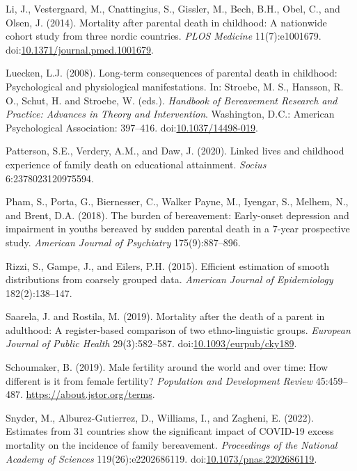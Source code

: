 \documentclass[
  11pt,
  letterpaper,
]{article}
\newlength{\cslhangindent}
\newlength{\cslentryspacingunit} %
\newenvironment{CSLReferences}[2] %
 {%
  \setlength{\parindent}{0pt}
  \ifodd #1
  \let\oldpar\par
  \def\par{\hangindent=\cslhangindent\oldpar}
  \fi
  \setlength{\parskip}{#2\cslentryspacingunit}
 }%
 {}
\begin{document}
\begin{CSLReferences}{1}{0}
\leavevmode{}%
Li, J., Vestergaard, M., Cnattingius, S., Gissler, M., Bech, B.H., Obel, C., and Olsen, J. (2014). Mortality after parental death in childhood: A nationwide cohort study from three nordic countries. \emph{PLOS Medicine} 11(7):e1001679. doi:\href{https://doi.org/10.1371/journal.pmed.1001679}{10.1371/journal.pmed.1001679}.

\leavevmode{}%
Luecken, L.J. (2008). Long-term consequences of parental death in childhood: Psychological and physiological manifestations. In: Stroebe, M. S., Hansson, R. O., Schut, H. and Stroebe, W. (eds.). \emph{Handbook of Bereavement Research and Practice: Advances in Theory and Intervention}. Washington, D.C.: American Psychological Association: 397--416. doi:\href{https://doi.org/10.1037/14498-019}{10.1037/14498-019}.

\leavevmode{}%
Patterson, S.E., Verdery, A.M., and Daw, J. (2020). Linked lives and childhood experience of family death on educational attainment. \emph{Socius} 6:2378023120975594.

\leavevmode{}%
Pham, S., Porta, G., Biernesser, C., Walker Payne, M., Iyengar, S., Melhem, N., and Brent, D.A. (2018). The burden of bereavement: Early-onset depression and impairment in youths bereaved by sudden parental death in a 7-year prospective study. \emph{American Journal of Psychiatry} 175(9):887--896.

\leavevmode{}%
Rizzi, S., Gampe, J., and Eilers, P.H. (2015). Efficient estimation of smooth distributions from coarsely grouped data. \emph{American Journal of Epidemiology} 182(2):138--147.

\leavevmode{}%
Saarela, J. and Rostila, M. (2019). Mortality after the death of a parent in adulthood: A register-based comparison of two ethno-linguistic groups. \emph{European Journal of Public Health} 29(3):582--587. doi:\href{https://doi.org/10.1093/eurpub/cky189}{10.1093/eurpub/cky189}.

\leavevmode{}%
Schoumaker, B. (2019). Male fertility around the world and over time: How different is it from female fertility? \emph{Population and Development Review} 45:459--487. \url{https://about.jstor.org/terms}.

\leavevmode{}%
Snyder, M., Alburez-Gutierrez, D., Williams, I., and Zagheni, E. (2022). Estimates from 31 countries show the significant impact of COVID-19 excess mortality on the incidence of family bereavement. \emph{Proceedings of the National Academy of Sciences} 119(26):e2202686119. doi:\href{https://doi.org/10.1073/pnas.2202686119}{10.1073/pnas.2202686119}.


\end{CSLReferences}
\end{document}
